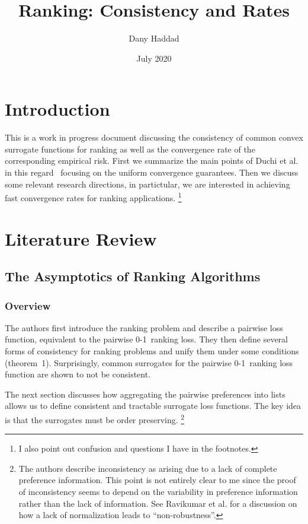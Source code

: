 \documentclass[a4paper,10pt]{article}
\begin{document}
\title{Ranking: Consistency and Rates}
\author{Dany Haddad}
\date{July 2020}
\maketitle

\section{Introduction}

This is a work in progress document discussing the consistency of
common convex surrogate functions for ranking as well as the
convergence rate of the corresponding empirical risk. First we
summarize the main points of Duchi et al. in this
regard~\cite{duchi-2010-ranking,duchi-2013-ranking} focusing on the
uniform convergence guarantees. Then we discuss some relevant research
directions, in partictular, we are interested in achieving fast
convergence rates for ranking applications.  \footnote{I also point
  out confusion and questions I have in the footnotes.}

\section{Literature Review}

\subsection{The Asymptotics of Ranking Algorithms}

\subsubsection{Overview}

The authors first introduce the ranking problem and describe a
pairwise loss function, equivalent to the pairwise 0-1~ranking
loss. They then define several forms of consistency for ranking
problems and unify them under some conditions
(theorem~1). Surprisingly, common surrogates for the pairwise
0-1~ranking loss function are shown to not be consistent.

The next section discusses how aggregating the pairwise preferences
into lists allows us to define consistent and tractable surrogate loss
functions. The key idea is that the surrogates must be order preserving.
\footnote{The authors describe inconsistency as arising due to a lack of complete preference information. This point is not entirely clear to me since the proof of inconsistency seems to depend on the variability in preference information rather than the lack of information. See Ravikumar et al. \cite{ravikumar-2011-ranking} for a discussion on how a lack of normalization leads to ``non-robustness''.}
\end{document}
